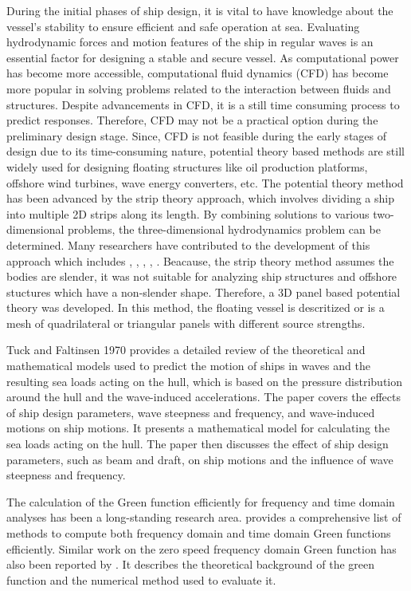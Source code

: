 During the initial phases of ship design, it is vital to have knowledge about the vessel's stability to ensure efficient and safe 
operation at sea. Evaluating hydrodynamic forces and motion features of the ship in regular 
waves is an essential factor for designing a stable and secure vessel. As computational power 
has become more accessible, computational fluid dynamics (CFD) has become more popular 
in solving problems related to the interaction between fluids and structures. 
Despite advancements in CFD, it is a still time consuming process to predict responses. Therefore, 
CFD may not be a practical option during the preliminary design stage. 
Since, CFD is not feasible during the early stages of design due to its time-consuming nature,
potential theory based methods are still widely used for designing floating structures like oil 
production platforms, offshore wind turbines, wave energy converters, etc.
The potential theory method has been advanced by the strip theory approach, 
which involves dividing a ship into multiple 2D strips along its length. 
By combining solutions to various two-dimensional problems, the three-dimensional 
hydrodynamics problem can be determined. Many researchers have contributed to the 
development of this approach which includes \cite{newman1979theory}, 
\cite{ogilvie1969rational}, \cite{beck1990documentation}, \cite{journee2001theoretical}, 
\cite{salvesen1970ship}. Beacause, the strip theory method assumes the bodies are slender, it was 
not suitable for analyzing ship structures and offshore stuctures which have a non-slender shape.
Therefore, a 3D panel based potential theory was developed. In this method, the floating vessel is
descritized or is a mesh of quadrilateral or triangular panels with different source strengths.

Tuck and Faltinsen 1970 \cite{salvesen1970ship} provides a detailed review of the theoretical 
and mathematical models used to predict the motion of ships in waves and the resulting sea 
loads acting on the hull, which is based on the pressure distribution around the hull and 
the wave-induced accelerations. The paper covers the effects of ship design parameters, 
wave steepness and frequency, and wave-induced motions on ship motions. It presents a 
mathematical model for calculating the sea loads acting on the hull. The paper then 
discusses the effect of ship design parameters, such as beam and draft, on ship motions 
and the influence of wave steepness and frequency.

The calculation of the Green function efficiently for frequency and time domain analyses has 
been a long-standing research area. \cite{newman1979theory} provides a comprehensive list of 
methods to compute both frequency domain and time domain Green functions efficiently. 
Similar work on the zero speed frequency domain Green function has also been reported 
by \cite{telste1986numerical}. It describes the theoretical background of the green 
function and the numerical method used to evaluate it.

